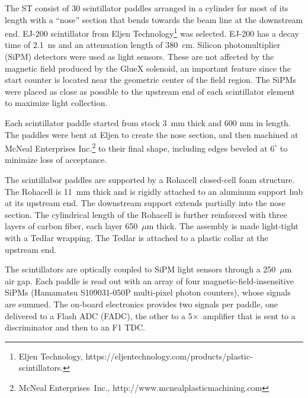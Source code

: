 The ST consist of 30 scintillator paddles arranged in a cylinder for
most of its length with a ``nose'' section that bends towards the beam
line at the downstream end. EJ-200 scintillator from Eljen
Technology\footnote{Eljen Technology, https://eljentechnology.com/products/plastic-scintillators.} was
selected. EJ-200 has a decay time of 2.1~ns and an attenuation length
of 380~cm. Silicon photomultiplier (SiPM) detectors were used as light
sensors. These are not affected by the magnetic field produced by the
GlueX solenoid, an important feature since the start counter is located
near the geometric center of the field region. The SiPMs were placed
as close as possible to the upstream end of each scintillator element
to maximize light collection.

Each scintillator paddle started from stock 3~mm thick and 600 mm in
length. The paddles were bent at Eljen to create the nose section, and then machined at McNeal Enterprises Inc.\footnote{McNeal
  Enterprises~Inc., http://www.mcnealplasticmachining.com} to their
final shape, including edges beveled at $6^\circ$ to minimize loss of
acceptance.

The scintillabor paddles are supported by a Rohacell closed-cell foam
structure. The Rohacell is 11~mm thick and is rigidly attached to an
aluminum support hub at its upstream end. The downstream support
extends partially into the nose section. The cylindrical length of the Rohacell is further reinforced with three layers of carbon fiber, each layer 650~$\mu$m thick. The assembly is made light-tight with a Tedlar wrapping. The Tedlar is attached to a plastic collar at the upstream end.

The scintillators are optically coupled to SiPM light sensors through a 250~$\mu$m air gap. Each paddle is read out with an array of four 
magnetic-field-insensitive SiPMs (Hamamatsu S109031-050P multi-pixel photon counters), whose signals are summed. 
The on-board electronics provides two signals per paddle, one delivered to a Flash ADC (FADC), the other to a 5$\times$~amplifier that is sent to a discriminator and then to an F1 TDC. 

